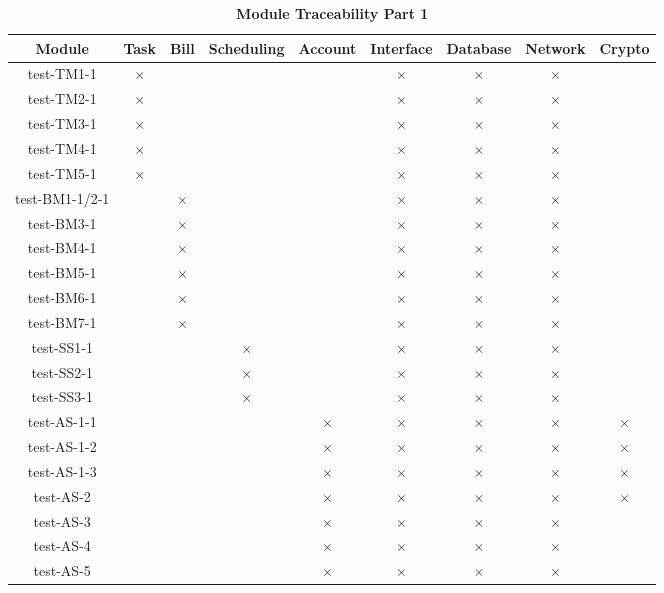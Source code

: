 \documentclass[12pt, titlepage]{article}
\begin{document}
\begin{table}[H]
\centering
\hspace*{-1cm}
\begin{tabular}{|c|c|c|c|c|c|c|c|c|}
\hline
Module & Task & Bill & Scheduling & Account & Interface & Database & Network & Crypto \\
\hline 
test-TM1-1 & $\times$ & & & & $\times$ & $\times$ & $\times$ &   \\
test-TM2-1 & $\times$ & & & & $\times$ & $\times$ & $\times$ &   \\
test-TM3-1 & $\times$ & & & & $\times$ & $\times$ & $\times$ &   \\
test-TM4-1 & $\times$ & & & & $\times$ & $\times$ & $\times$ &   \\
test-TM5-1 & $\times$ & & & & $\times$ & $\times$ & $\times$ &   \\
test-BM1-1/2-1& & $\times$ & & & $\times$ & $\times$ & $\times$ &   \\
test-BM3-1 & & $\times$ & & & $\times$ & $\times$ & $\times$ &   \\
test-BM4-1 & & $\times$ & & & $\times$ & $\times$ & $\times$ &   \\
test-BM5-1 & & $\times$ & & & $\times$ & $\times$ & $\times$ &   \\
test-BM6-1 & & $\times$ & & & $\times$ & $\times$ & $\times$ &   \\
test-BM7-1 & & $\times$ & & & $\times$ & $\times$ & $\times$ &   \\
test-SS1-1 & & & $\times$  & &  $\times$  &  $\times$  &  $\times$  &   \\
test-SS2-1 & & & $\times$  & &  $\times$  &  $\times$  &  $\times$  &   \\
test-SS3-1 & & & $\times$  & &  $\times$  &  $\times$  &  $\times$  &   \\
test-AS-1-1  & & & & $\times$ & $\times$ & $\times$ &  $\times$ & $\times$   \\
test-AS-1-2 & & & & $\times$ & $\times$ & $\times$ &  $\times$ & $\times$   \\
test-AS-1-3 & & & & $\times$ & $\times$ & $\times$ &  $\times$ & $\times$   \\
test-AS-2 & & & & $\times$ & $\times$ & $\times$ &  $\times$ & $\times$   \\
test-AS-3 & & & & $\times$ & $\times$ & $\times$ & $\times$ &   \\
test-AS-4 & & & & $\times$ & $\times$ & $\times$ & $\times$ &   \\
test-AS-5& & & & $\times$ & $\times$ & $\times$ & $\times$ &   \\
\hline
\end{tabular}
\caption{\bf Module Traceability Part 1}
\end{table}
\end{document}
